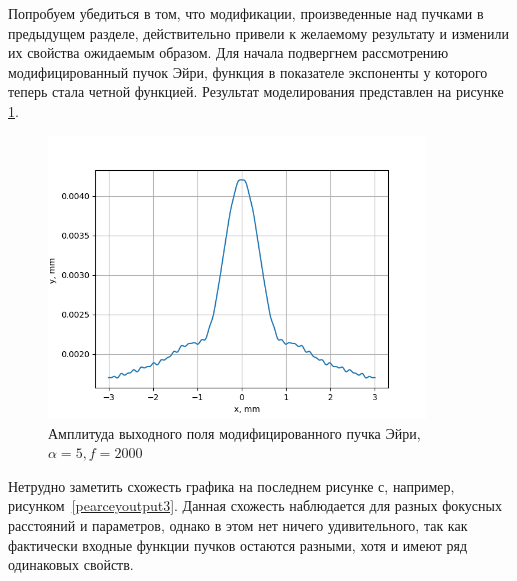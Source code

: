 {    Попробуем убедиться в том, что модификации, произведенные над пучками в предыдущем разделе,
    действительно привели к желаемому результату и изменили их свойства ожидаемым образом.
    Для начала подвергнем рассмотрению модифицированный пучок Эйри,
    функция в показателе экспоненты у которого теперь стала четной функцией.
    Результат моделирования представлен на рисунке \ref{aieven_output}.
    \begin{figure}[H]
        \begin{center}
            \includegraphics[width=10cm]{plots/aieven_output}
            \caption{Амплитуда выходного поля модифицированного пучка Эйри, $ \alpha  = 5, f = 2000$}
            \label{aieven_output}
        \end{center}
    \end{figure}
    Нетрудно заметить схожесть графика на последнем рисунке с, например,
    рисунком~\ref{pearceyoutput3}. Данная схожесть наблюдается для разных фокусных расстояний и параметров,
    однако в этом нет ничего удивительного, так как фактически входные функции пучков остаются разными,
    хотя и имеют ряд одинаковых свойств.

}

